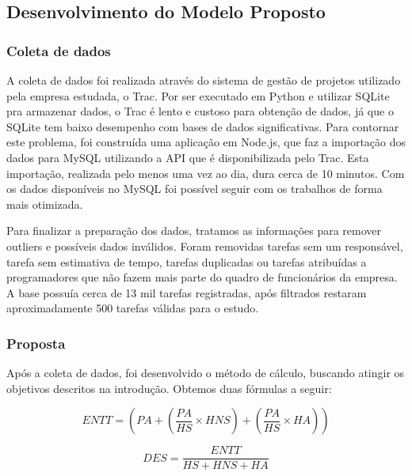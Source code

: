 \subsection{Desenvolvimento do Modelo Proposto}

\subsubsection{Coleta de dados}
A coleta de dados foi realizada através do sistema de gestão de projetos utilizado pela empresa estudada, o Trac\footnotemark[1].
Por ser executado em Python e utilizar SQLite pra armazenar dados, o Trac é lento e custoso para obtenção de dados, já que o SQLite tem baixo desempenho com bases de dados significativas. Para contornar este problema, foi construída uma aplicação em Node.js, que faz a importação dos dados para MySQL utilizando a API que é disponibilizada pelo Trac. Esta importação, realizada pelo menos uma vez ao dia, dura cerca de 10 minutos. Com os dados disponíveis no MySQL foi possível seguir com os trabalhos de forma mais otimizada. \par

Para finalizar a preparação dos dados, tratamos as informações para remover outliers e possíveis dados inválidos. Foram removidas tarefas sem um responsável, tarefa sem estimativa de tempo, tarefas duplicadas ou tarefas atribuídas a programadores que não fazem mais parte do quadro de funcionários da empresa. A base possuía cerca de 13 mil tarefas registradas, após filtrados restaram aproximadamente 500 tarefas válidas para o estudo.\par

\subsubsection{Proposta}

Após a coleta de dados, foi desenvolvido o método de cálculo, buscando atingir os objetivos descritos na introdução. Obtemos duas fórmulas a seguir:

\begin{equation} \label{nova_1}
    ENTT = (PA + (\frac{PA}{HS} \times HNS ) + ( \frac{PA}{HS} \times HA )) 
\end{equation}

\bigskip

\begin{equation} \label{nova_2}
    DES = \frac{ENTT}{HS + HNS + HA}
\end{equation}

